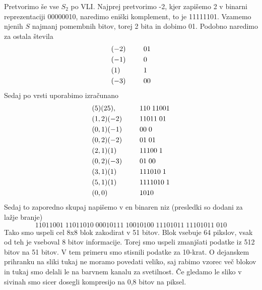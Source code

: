 \documentclass[a4paper,12pt,openright]{book}
\begin{document}
Pretvorimo še vse $S_2$ po VLI. Najprej pretvorimo -2, kjer zapišemo 2 v binarni reprezentaciji 00000010, naredimo eniški komplement, to je 11111101. Vzamemo njenih $S$ najmanj pomembnih bitov, torej 2 bita in dobimo 01. Podobno naredimo za ostala števila
\begin{alignat*}{2}
    &(-2) \indent && 01 \\
    &(-1) \indent && 0 \\
    &(1)  \indent && 1 \\ 
    &(-3) \indent && 00 
\end{alignat*}
Sedaj po vrsti uporabimo izračunano
\begin{alignat*}{2}
    &(5)(25),  \indent  &&110\;11001\\
    &(1,2)(-2) \indent  &&11011\;01\\
    &(0,1)(-1) \indent  &&00\;0\\
    &(0,2)(-2) \indent  &&01\;01\\
    &(2,1)(1)  \indent  &&11100\;1\\
    &(0,2)(-3) \indent  &&01\;00\\
    &(3,1)(1)  \indent  &&111010\;1\\
    &(5,1)(1)  \indent  &&1111010\;1\\
    &(0,0)     \indent  &&1010
\end{alignat*}
Sedaj to zaporedno skupaj napišemo v en binaren niz (presledki so dodani za lažje branje) 
\begin{equation*}
11011001\;11011010\;00010111\;10010100\;11101011\;11101011\;010
\end{equation*}
Tako smo uspeli cel 8x8 blok zakodirat v 51 bitov. Blok vsebuje 64 pikslov, vsak od teh je vseboval 8 bitov informacije. Torej smo uspeli zmanjšati podatke iz 512 bitov na 51 bitov. V tem primeru smo stisnili podatke za 10-krat. O dejanskem prihranku na sliki tukaj ne moramo povedati veliko, saj rabimo vzorec več blokov in tukaj smo delali le na barvnem kanalu za svetilnost. Če gledamo le sliko v sivinah smo sicer dosegli kompresijo na 0,8 bitov na piksel.
\end{document}
